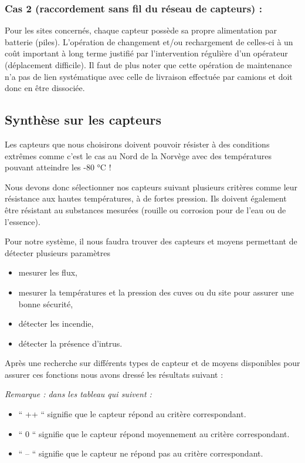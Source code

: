 \documentclass{article}
\begin{document}
\subsubsection{Cas 2 (raccordement sans fil du réseau de capteurs) :}

Pour les sites concernés, chaque capteur possède sa propre alimentation
par batterie (piles). L’opération de changement et/ou rechargement de
celles-ci à un coût important à long terme justifié par l’intervention
régulière d’un opérateur (déplacement difficile). Il faut de plus noter
que cette opération de maintenance n’a pas de lien systématique avec
celle de livraison effectuée par camions et doit donc en être
dissociée.

\subsection{Synthèse sur les capteurs}

Les capteurs que nous choisirons doivent pouvoir résister à des
conditions extrêmes comme c’est le cas au Nord de la Norvège avec des
températures pouvant atteindre les -80 °C !

Nous devons donc sélectionner nos capteurs suivant plusieurs critères
comme leur résistance aux hautes températures, à de fortes pression.
Ils doivent également être résistant au substances mesurées (rouille ou
corrosion pour de l’eau ou de l’essence).




Pour notre système, il nous faudra trouver des capteurs et moyens
permettant de détecter plusieurs paramètres

\begin{itemize}
\item mesurer les flux, 
\item mesurer la températures et la pression des cuves ou du site pour
assurer une bonne sécurité,
\item détecter les incendie,
\item détecter la présence d’intrus.
\end{itemize}



Après une recherche sur différents types de capteur et de moyens
disponibles pour assurer ces fonctions nous avons dressé les résultats
suivant :

\emph{Remarque : dans les tableau qui suivent :}
\begin{itemize}
\item  “ ++ “ signifie que le capteur répond au critère correspondant.
\item  “ 0 “ signifie que le capteur répond moyennement au critère
correspondant.
\item  “ -- “ signifie que le capteur ne répond pas au
critère correspondant.
\end{itemize}
\end{document}
